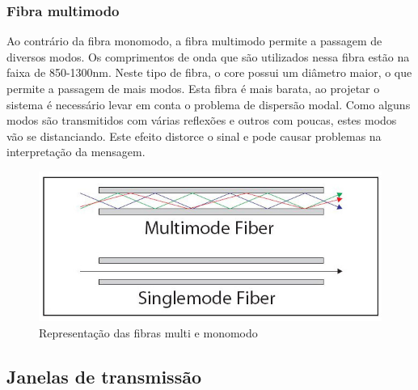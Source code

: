 \documentclass[article]{IEEEtran}
\begin{document}
\subsubsection{Fibra multimodo}
Ao contrário da fibra monomodo, a fibra multimodo permite a passagem de diversos modos. Os comprimentos de onda que são utilizados nessa fibra estão na faixa de 850-1300nm. Neste tipo de fibra, o core possui um diâmetro maior, o que permite a passagem de mais modos. Esta fibra é mais barata, ao projetar o sistema é necessário levar em conta o problema de dispersão modal. Como alguns modos são transmitidos com várias reflexões e outros com poucas, estes modos vão se distanciando. Este efeito distorce o sinal e pode causar problemas na interpretação da mensagem.

\begin{figure}[h]
\includegraphics[width=\columnwidth]{mono-multi.jpg}
\caption{Representação das fibras multi e monomodo}
\end{figure}


\subsection{Janelas de transmissão}
\end{document}
